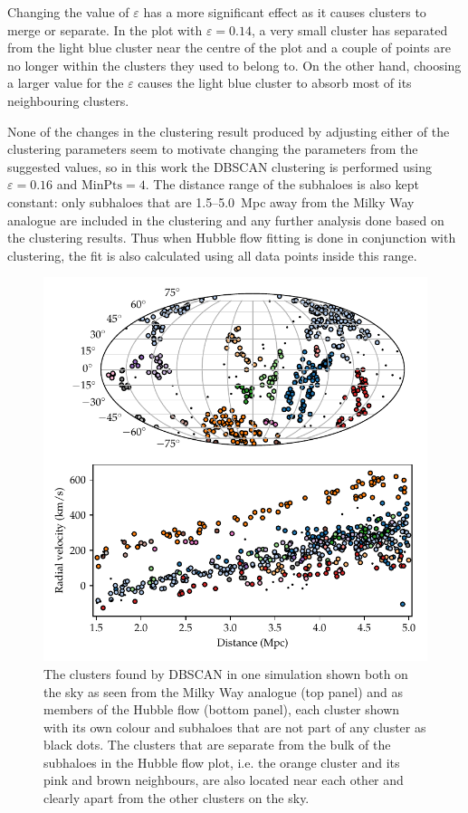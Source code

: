 \documentclass[english, twoside]{HYgradu}
\begin{document}
Changing the value of $\varepsilon$ has a more significant effect as it causes clusters to merge or separate. In the plot with $\varepsilon = 0.14$, a very small cluster has separated from the light blue cluster near the centre of the plot and a couple of points are no longer within the clusters they used to belong to. On the other hand, choosing a larger value for the $\varepsilon$ causes the light blue cluster to absorb most of its neighbouring clusters.

None of the changes in the clustering result produced by adjusting either of the clustering parameters seem to motivate changing the parameters from the suggested values, so in this work the DBSCAN clustering is performed using $\varepsilon=0.16$ and $\mathrm{MinPts}=4$. The distance range of the subhaloes is also kept constant: only subhaloes that are 1.5--5.0~Mpc away from the Milky Way analogue are included in the clustering and any further analysis done based on the clustering results. Thus when Hubble flow fitting is done in conjunction with clustering, the  fit is also calculated using all data points inside this range.

\begin{figure}
    \centering
    \includegraphics{kuvat/mollweide+hubble.pdf}
    \caption{The clusters found by DBSCAN in one simulation shown both on the sky as seen from the Milky Way analogue (top panel) and as members of the Hubble flow (bottom panel), each cluster shown with its own colour and subhaloes that are not part of any cluster as black dots. The clusters that are separate from the bulk of the subhaloes in the Hubble flow plot, i.e. the orange cluster and its pink and brown neighbours, are also located near each other and clearly apart from the other clusters on the sky.}\label{fig:mollweide+hubble}
\end{figure}
\end{document}
